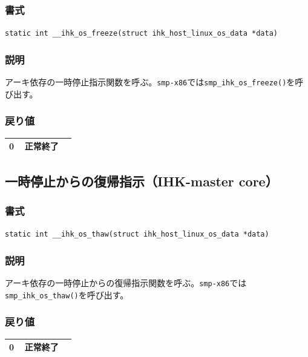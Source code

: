 \documentclass[twoside,11pt,fleqn]{book}
\begin{document}
\subsubsection*{書式}{\quad} \texttt{static int \_\_ihk\_os\_freeze(struct ihk\_host\_linux\_os\_data *data)}
\subsubsection*{説明}{\quad} 
アーキ依存の一時停止指示関数を呼ぶ。\texttt{smp-x86}では\texttt{smp\_ihk\_os\_freeze()}を呼び出す。
\subsubsection*{戻り値}{\quad}
\begin{table}[!h]
\footnotesize
\begin{tabular}{|p{0.20\linewidth}|p{0.66\linewidth}|} \hline
0&正常終了\\ \hline
\end{tabular}
\vspace{-0em}
\end{table}
\FloatBarrier

\subsection{一時停止からの復帰指示（IHK-master core）}
\subsubsection*{書式}{\quad} \texttt{static int \_\_ihk\_os\_thaw(struct ihk\_host\_linux\_os\_data *data)}
\subsubsection*{説明}{\quad} 
アーキ依存の一時停止からの復帰指示関数を呼ぶ。\texttt{smp-x86}では\texttt{smp\_ihk\_os\_thaw()}を呼び出す。
\subsubsection*{戻り値}{\quad}
\begin{table}[!h]
\footnotesize
\begin{tabular}{|p{0.20\linewidth}|p{0.66\linewidth}|} \hline
0&正常終了\\ \hline
\end{tabular}
\vspace{-0em}
\end{table}
\FloatBarrier
\end{document}

